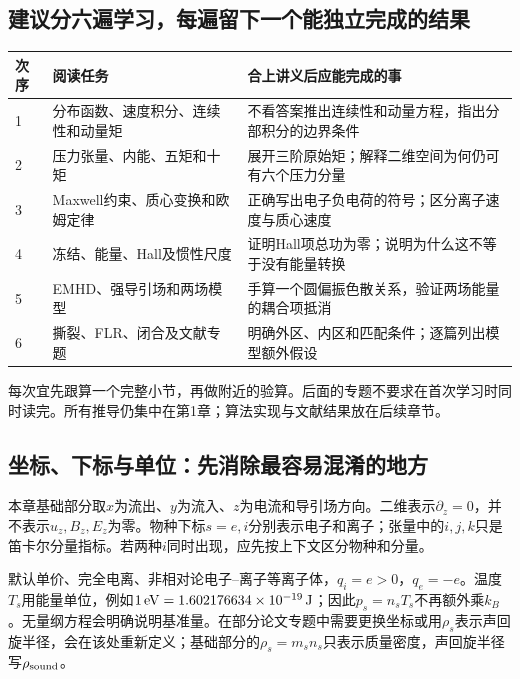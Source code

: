 \documentclass[UTF8,a4paper,11pt,openany,fontset=fandol]{ctexbook}
\begin{document}
\subsection{建议分六遍学习，每遍留下一个能独立完成的结果}
\begin{longtable}{P{14mm}P{66mm}P{69mm}}
\toprule 次序 & 阅读任务 & 合上讲义后应能完成的事\\ & 分布函数、速度积分、连续性和动量矩 & 不看答案推出连续性和动量方程，指出分部积分的边界条件\\
2 & 压力张量、内能、五矩和十矩 & 展开三阶原始矩；解释二维空间为何仍可有六个压力分量\\
3 & Maxwell约束、质心变换和欧姆定律 & 正确写出电子负电荷的符号；区分离子速度与质心速度\\
4 & 冻结、能量、Hall及惯性尺度 & 证明Hall项总功为零；说明为什么这不等于没有能量转换\\
5 & EMHD、强导引场和两场模型 & 手算一个圆偏振色散关系，验证两场能量的耦合项抵消\\
6 & 撕裂、FLR、闭合及文献专题 & 明确外区、内区和匹配条件；逐篇列出模型额外假设\\\bottomrule
\end{longtable}
每次宜先跟算一个完整小节，再做附近的验算。后面的专题不要求在首次学习时同时读完。所有推导仍集中在第1章；算法实现与文献结果放在后续章节。

\subsection{坐标、下标与单位：先消除最容易混淆的地方}
本章基础部分取$x$为流出、$y$为流入、$z$为电流和导引场方向。二维表示$\partial_z=0$，并不表示$u_z,B_z,E_z$为零。物种下标$s=e,i$分别表示电子和离子；张量中的$i,j,k$只是笛卡尔分量指标。若两种$i$同时出现，应先按上下文区分物种和分量。

默认单价、完全电离、非相对论电子--离子等离子体，$q_i=e>0$，$q_e=-e$。温度$T_s$用能量单位，例如$1\,{\rm eV}=1.602176634\times10^{-19}\,{\rm J}$；因此$p_s=n_sT_s$不再额外乘$k_B$。无量纲方程会明确说明基准量。在部分论文专题中需要更换坐标或用$\rho_s$表示声回旋半径，会在该处重新定义；基础部分的$\rho_s=m_sn_s$只表示质量密度，声回旋半径写$\rho_{\rm sound}$。
\end{document}
